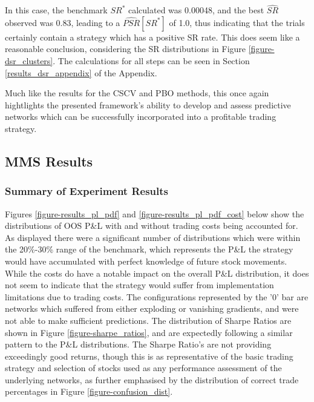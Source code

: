 \documentclass[a4paper,11pt,oneside]{article}
\theoremstyle{plain}
\theoremstyle{definition}
\begin{document}
	In this case, the benchmark $SR^*$ calculated was 0.00048, and the best $\widehat{SR}$ observed was 0.83, leading to a $\widehat{PSR}[SR^*]$ of 1.0, thus indicating that the trials certainly contain a strategy which has a positive SR rate. This does seem like a reasonable conclusion, considering the SR distributions in Figure \ref{figure-dsr_clusters}. The calculations for all steps can be seen in Section \ref{results_dsr_appendix} of the Appendix. \newline

	Much like the results for the CSCV and PBO methods, this once again hightlights the presented framework's ability to develop and assess predictive networks which can be successfully incorporated into a profitable trading strategy.	
	
	
	\newpage
	\subsection{MMS Results}\label{results_mms}
	
	
	\subsubsection{Summary of Experiment Results}
	
	Figures \ref{figure-results_pl_pdf} and \ref{figure-results_pl_pdf_cost} below show the distributions of OOS P\&L with and without trading costs being accounted for. As displayed there were a significant number of distributions which were within the 20\%-30\% range of the benchmark, which represents the P\&L the strategy would have accumulated with perfect knowledge of future stock movements. While the costs do have a notable impact on the overall P\&L distribution, it does not seem to indicate that the strategy would suffer from implementation limitations due to trading costs. The configurations represented by the '0' bar are networks which suffered from either exploding or vanishing gradients, and were not able to make sufficient predictions. The distribution of Sharpe Ratios are shown in Figure \ref{figure-sharpe_ratios}, and are expectedly following a similar pattern to the P\&L distributions. The Sharpe Ratio's are not providing exceedingly good returns, though this is as representative of the basic trading strategy and selection of stocks used as any performance assessment of the underlying networks, as further emphasised by the distribution of correct trade percentages in Figure \ref{figure-confusion_dist}. \newline 
	
\end{document}
